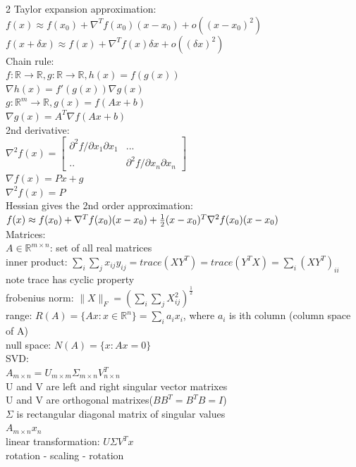 \documentclass[8pt]{extarticle}
\newcommand{\R}{\mathbb{R}}
\begin{document}
\begin{multicols*}{2}
  Taylor expansion approximation:\\
  $f(x) \approx f(x_0) + \nabla^T f(x_0)(x-x_0) + o((x-x_0)^2)$\\
  $f(x+\delta x) \approx f(x) + \nabla^T f(x)\delta x + o((\delta x)^2)$\\
  
  Chain rule:\\
  $f: \R \to \R, g: \R \to \R, h(x) = f(g(x))$\\
  $\nabla h(x) = f'(g(x))  \nabla g(x)$\\

  $g:\R^m \to \R, g(x) = f(Ax+b)$\\
  $\nabla g(x) = A^T \nabla f(Ax+b)$\\

  2nd derivative:\\
  $\nabla^2 f(x)=\begin{bmatrix}
    \partial^2 f / \partial x_1 \partial x_1 & ...\\
    .. & \partial^2 f / \partial x_n \partial x_n
  \end{bmatrix}$\\
  $\nabla f(x)=Px+g$\\
  $\nabla^2 f(x)=P$\\

  Hessian gives the 2nd order approximation:\\
  $f(x) \approx f(x_0) + \nabla^T f(x_0)(x-x_0) + \\ \frac{1}{2}(x-x_0)^T \nabla^2 f(x_0) (x-x_0)$\\

  Matrices:\\
  $A \in \R^{m \times n}$: set of all real matrices\\
  inner product: $\sum_i \sum_j x_{ij} y_{ij} = trace(XY^T)=trace(Y^TX)=\sum_{i}(XY^T)_{ii}$\\
  note trace has cyclic property\\
  frobenius norm: $\|X\|_F  = (\sum_i \sum_j X_{ij}^2)^{\frac{1}{2}}$\\
  range: $R(A) = \{Ax: x \in \R^n\}=\sum_i a_i x_i$, where $a_i$ is ith column (column space of A)\\
  null space: $N(A) = \{ x : Ax = 0\}$\\

  SVD:\\
  $A_{m \times n} = U_{m \times m} \Sigma_{m \times n} V_{n \times n}^T$\\
  U and V are left and right singular vector matrixes\\
  U and V are orthogonal matrixes($BB^T=B^TB=I$)\\
  $\Sigma$ is rectangular diagonal matrix of singular values\\
  $A_{m \times n}x_{n}$\\
  linear transformation: $U \Sigma V^T x$\\
  rotation - scaling - rotation
  \vfill\null
  \columnbreak
  

\end{multicols*}
\end{document}
